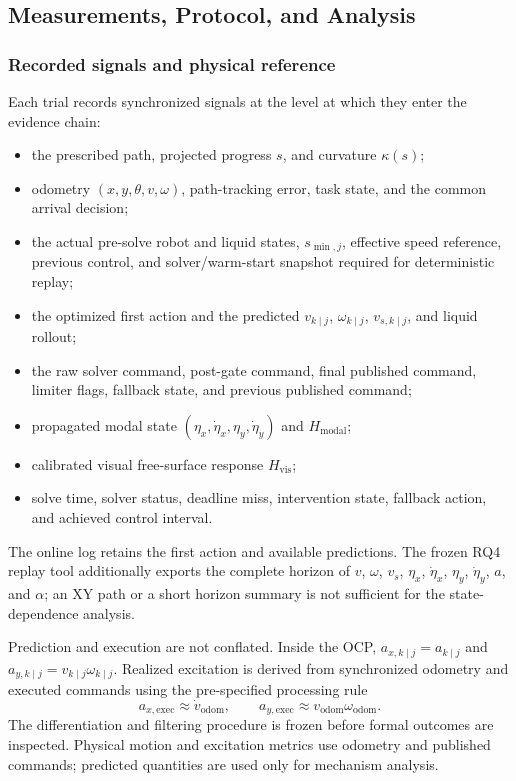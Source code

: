 \subsection{Measurements, Protocol, and Analysis}

\subsubsection{Recorded signals and physical reference}

Each trial records synchronized signals at the level at which they enter the
evidence chain:
\begin{itemize}
  \item the prescribed path, projected progress $s$, and curvature $\kappa(s)$;
  \item odometry $(x,y,\theta,v,\omega)$, path-tracking error, task state, and
  the common arrival decision;
  \item the actual pre-solve robot and liquid states, $s_{\min,j}$, effective
  speed reference, previous control, and solver/warm-start snapshot required
  for deterministic replay;
  \item the optimized first action and the predicted $v_{k\mid j}$,
  $\omega_{k\mid j}$, $v_{s,k\mid j}$, and liquid rollout;
  \item the raw solver command, post-gate command, final published command,
  limiter flags, fallback state, and previous published command;
  \item propagated modal state
  $(\eta_x,\dot\eta_x,\eta_y,\dot\eta_y)$ and $H_{\mathrm{modal}}$;
  \item calibrated visual free-surface response $H_{\mathrm{vis}}$;
  \item solve time, solver status, deadline miss, intervention state, fallback
  action, and achieved control interval.
\end{itemize}

The online log retains the first action and available predictions. The frozen
RQ4 replay tool additionally exports the complete horizon of
$v$, $\omega$, $v_s$, $\eta_x$, $\dot\eta_x$, $\eta_y$, $\dot\eta_y$, $a$,
and $\alpha$; an XY path or a short horizon summary is not sufficient for the
state-dependence analysis.

Prediction and execution are not conflated. Inside the OCP,
$a_{x,k\mid j}=a_{k\mid j}$ and
$a_{y,k\mid j}=v_{k\mid j}\omega_{k\mid j}$. Realized excitation is derived
from synchronized odometry and executed commands using the pre-specified
processing rule
\[
  a_{x,\mathrm{exec}}\approx\dot v_{\mathrm{odom}},
  \qquad
  a_{y,\mathrm{exec}}\approx
  v_{\mathrm{odom}}\omega_{\mathrm{odom}}.
\]
The differentiation and filtering procedure is frozen before formal outcomes
are inspected. Physical motion and excitation metrics use odometry and
published commands; predicted quantities are used only for mechanism analysis.

